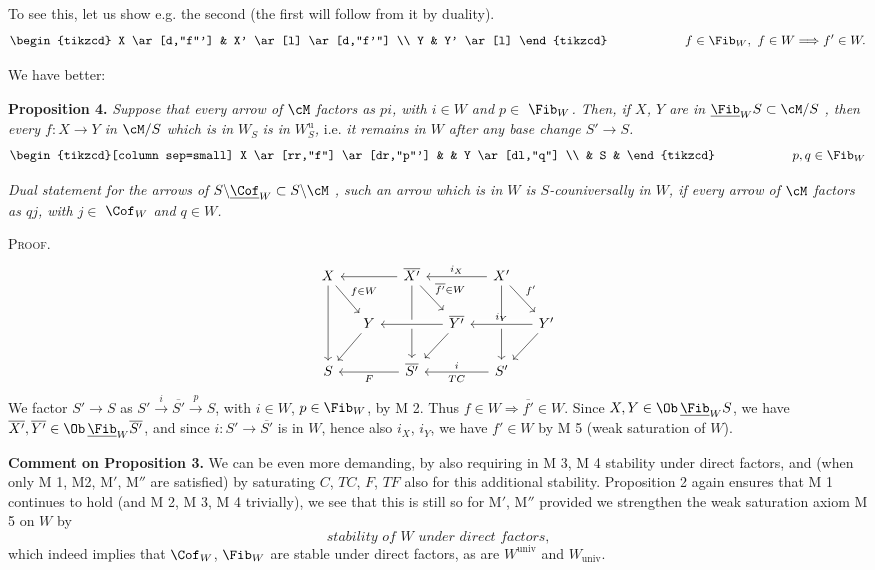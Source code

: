 To see this, let us show e.g. the second (the first will follow from it by duality).
\[
\begin{tikzcd}
X \ar[d,"f"'] & X' \ar[l] \ar[d,"f'"] \\
Y & Y' \ar[l]
\end{tikzcd}
\qquad\qquad\qquad
f\in\Fib_W,\ f\in W\Longrightarrow f'\in W.
\]

We have better:

\textbf{Proposition 4.} \textit{Suppose that every arrow of $\cM$ factors as $pi$, with $i\in W$ and $p\in$} $\Fib_W$\textit{. Then, if $X$, $Y$ are in} $\underline{\Fib}_W S\subset\cM/S$ \textit{, then every $f:X\longrightarrow Y$ in $\cM/S$ which is in} $W_S$ \textit{is in $W^{\mathrm{u}}_S$,} i.e. \textit{it remains in $W$ after any base change $S'\longrightarrow S$.}
\[
\begin{tikzcd}[column sep=small]
X \ar[rr,"f"] \ar[dr,"p"'] & & Y \ar[dl,"q"] \\
& S &
\end{tikzcd}
\qquad\qquad\qquad
p,q\in\Fib_W
\]

\textit{Dual statement for the arrows of} $S\backslash\underline{\Cof}_W\subset S\backslash\cM$ \textit{, such an arrow which is in $W$ is $S$-couniversally in $W$, if every arrow of $\cM$ factors as $qj$, with $j\in$} $\Cof_W$ \textit{and $q\in W$.}

\textsc{Proof}.
\[
\begin{tikzcd}[column sep=small]
X \ar[dr,"f\in W"] \ar[dd] & & \overline{X'} \ar[ll] \ar[dr,"\overline{f'}\in W"] \ar[dd] & & X' \ar[ll,"i_X"'] \ar[dr,"f'"] \ar[dd] & \\
& Y \ar[dl] & & \overline{Y'} \ar[ll,crossing over] \ar[dl] & & Y' \ar[ll,"i_Y"',crossing over] \ar[dl] \\
S & & \overline{S'} \ar[ll,"F"] & & S' \ar[ll,"i"',"TC"] &
\end{tikzcd}
\]
We factor $S'\longrightarrow S$ as $S'\overset{i}{\longrightarrow}\overline{S'}\overset{p}{\longrightarrow}S$, with $i\in W$, $p\in\Fib_W$, by M 2. Thus $f\in W\Longrightarrow\overline{f'}\in W$. Since $X,Y\in\Ob\,\underline{\Fib}_W S$, we have $\overline{X'},\overline{Y'}\in\Ob\,\underline{\Fib}_W\overline{S'}$, and since $i:S'\longrightarrow\overline{S'}$ is in $W$, hence also $i_X$, $i_Y$, we have $f'\in W$ by M 5 (weak saturation of $W$).

\textbf{Comment on Proposition 3.} We can be even more demanding, by also requiring in M 3, M 4 stability under direct factors, and (when only M 1, M2, M$'$, M$''$ %
are satisfied) by saturating $C$, $TC$, $F$, $TF$ also for this additional stability. Proposition 2 again ensures that M 1 continues to hold (and M 2, M 3, M 4 trivially), we see that this is still so for M$'$, M$''$ provided we strengthen the weak saturation axiom M 5 on $W$ by
\[
\textit{stability of $W$ under direct factors,}
\]
which indeed implies that $\Cof_W$, $\Fib_W$ are stable under direct factors, as are $W^{\mathrm{univ}}$ and $W_{\mathrm{univ}}$.

